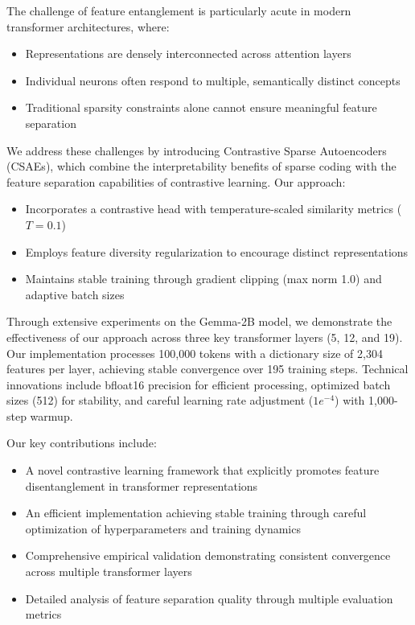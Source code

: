\documentclass{article} %
\begin{document}
The challenge of feature entanglement is particularly acute in modern transformer architectures, where:
\begin{itemize}
    \item Representations are densely interconnected across attention layers
    \item Individual neurons often respond to multiple, semantically distinct concepts
    \item Traditional sparsity constraints alone cannot ensure meaningful feature separation
\end{itemize}

We address these challenges by introducing Contrastive Sparse Autoencoders (CSAEs), which combine the interpretability benefits of sparse coding with the feature separation capabilities of contrastive learning. Our approach:
\begin{itemize}
    \item Incorporates a contrastive head with temperature-scaled similarity metrics ($T=0.1$)
    \item Employs feature diversity regularization to encourage distinct representations
    \item Maintains stable training through gradient clipping (max norm 1.0) and adaptive batch sizes
\end{itemize}

Through extensive experiments on the Gemma-2B model, we demonstrate the effectiveness of our approach across three key transformer layers (5, 12, and 19). Our implementation processes 100,000 tokens with a dictionary size of 2,304 features per layer, achieving stable convergence over 195 training steps. Technical innovations include bfloat16 precision for efficient processing, optimized batch sizes (512) for stability, and careful learning rate adjustment ($1e^{-4}$) with 1,000-step warmup.

\noindent Our key contributions include:
\begin{itemize}
    \item A novel contrastive learning framework that explicitly promotes feature disentanglement in transformer representations
    \item An efficient implementation achieving stable training through careful optimization of hyperparameters and training dynamics
    \item Comprehensive empirical validation demonstrating consistent convergence across multiple transformer layers
    \item Detailed analysis of feature separation quality through multiple evaluation metrics
\end{itemize}
\end{document}
